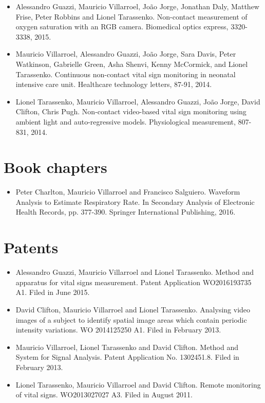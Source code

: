 \begin{itemize}
    \item Alessandro Guazzi, Mauricio Villarroel, Jo\~{a}o Jorge, Jonathan Daly, Matthew Frise,  Peter Robbins and Lionel Tarassenko. Non-contact measurement of oxygen saturation with an RGB camera. Biomedical optics express, 3320-3338, 2015.

    \item Mauricio Villarroel, Alessandro Guazzi, Jo\~{a}o Jorge, Sara Davis,  Peter Watkinson, Gabrielle Green, Asha Shenvi, Kenny McCormick, and Lionel Tarassenko. Continuous non-contact vital sign monitoring in neonatal intensive care unit. Healthcare technology letters, 87-91,  2014.

    \item Lionel Tarassenko, Mauricio Villarroel, Alessandro Guazzi, Jo\~{a}o Jorge, David Clifton, Chris Pugh. Non-contact video-based vital sign monitoring using ambient light and auto-regressive models. Physiological measurement, 807-831, 2014.
   
\end{itemize}

\section*{Book chapters}

\begin{itemize}

    \item Peter Charlton, Mauricio Villarroel and Francisco Salguiero. Waveform Analysis to Estimate Respiratory Rate. In Secondary Analysis of Electronic Health Records, pp. 377-390. Springer International Publishing,  2016.
   
\end{itemize}

\section*{Patents}

\begin{itemize}

    \item Alessandro Guazzi, Mauricio Villarroel and Lionel Tarassenko. Method and apparatus for vital signs measurement.  Patent Application WO2016193735 A1. Filed in June 2015.

    \item David Clifton, Mauricio Villarroel and Lionel Tarassenko.  Analysing video images of a subject to identify spatial image areas which contain periodic intensity variations. WO 2014125250 A1.  Filed in February 2013.
        
    \item Mauricio Villarroel, Lionel Tarassenko and David Clifton. Method and System for Signal Analysis.  Patent Application No. 1302451.8. Filed in February 2013.

    \item Lionel Tarassenko, Mauricio Villarroel and David Clifton.  Remote monitoring of vital signs. WO2013027027 A3. Filed in August 2011.

\end{itemize}
